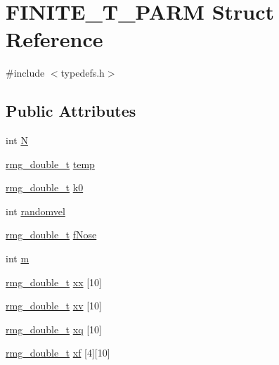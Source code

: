 \hypertarget{struct_f_i_n_i_t_e___t___p_a_r_m}{\section{F\-I\-N\-I\-T\-E\-\_\-\-T\-\_\-\-P\-A\-R\-M Struct Reference}
\label{struct_f_i_n_i_t_e___t___p_a_r_m}
}


{\ttfamily \#include $<$typedefs.\-h$>$}

\subsection*{Public Attributes}
\begin{DoxyCompactItemize}
\item 
int \hyperlink{struct_f_i_n_i_t_e___t___p_a_r_m_a4bd10266c09050415ce8be1b86fb1b77}{N}
\item 
\hyperlink{rmgtypes_8h_aaa16921c14f121c56eaa42390a340db8}{rmg\-\_\-double\-\_\-t} \hyperlink{struct_f_i_n_i_t_e___t___p_a_r_m_a41e3bff99aed4fc1c16ed656f48dc0a6}{temp}
\item 
\hyperlink{rmgtypes_8h_aaa16921c14f121c56eaa42390a340db8}{rmg\-\_\-double\-\_\-t} \hyperlink{struct_f_i_n_i_t_e___t___p_a_r_m_a1a2bc51ccc430170b5f9603940daad8e}{k0}
\item 
int \hyperlink{struct_f_i_n_i_t_e___t___p_a_r_m_a4b64468505f59f2dbb2a4a6bad03042c}{randomvel}
\item 
\hyperlink{rmgtypes_8h_aaa16921c14f121c56eaa42390a340db8}{rmg\-\_\-double\-\_\-t} \hyperlink{struct_f_i_n_i_t_e___t___p_a_r_m_a11f95989be70b51f1a2516c36167e3d9}{f\-Nose}
\item 
int \hyperlink{struct_f_i_n_i_t_e___t___p_a_r_m_a57841f6cf70f82c147051faef304ead7}{m}
\item 
\hyperlink{rmgtypes_8h_aaa16921c14f121c56eaa42390a340db8}{rmg\-\_\-double\-\_\-t} \hyperlink{struct_f_i_n_i_t_e___t___p_a_r_m_a1309b0eb11c884b7f668560185cf2e42}{xx} \mbox{[}10\mbox{]}
\item 
\hyperlink{rmgtypes_8h_aaa16921c14f121c56eaa42390a340db8}{rmg\-\_\-double\-\_\-t} \hyperlink{struct_f_i_n_i_t_e___t___p_a_r_m_acebe4b0fbc137c5e685368cd65d37a1b}{xv} \mbox{[}10\mbox{]}
\item 
\hyperlink{rmgtypes_8h_aaa16921c14f121c56eaa42390a340db8}{rmg\-\_\-double\-\_\-t} \hyperlink{struct_f_i_n_i_t_e___t___p_a_r_m_adbdccaf8649170d1524014788894a003}{xq} \mbox{[}10\mbox{]}
\item 
\hyperlink{rmgtypes_8h_aaa16921c14f121c56eaa42390a340db8}{rmg\-\_\-double\-\_\-t} \hyperlink{struct_f_i_n_i_t_e___t___p_a_r_m_a1a51bc0266982a877828508a2578b133}{xf} \mbox{[}4\mbox{]}\mbox{[}10\mbox{]}

\end{DoxyCompactItemize}
